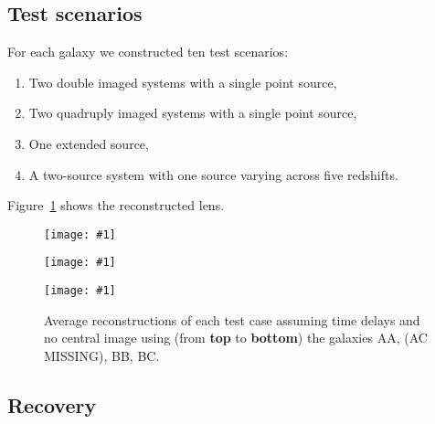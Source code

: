 \documentclass[onecolumn,galley]{mn2e}
\newcommand{\tabref}[1] {Table~\ref{#1}}
\newcommand{\figref}[1] {Figure~\ref{#1}}
\newcommand\plotone[1]{%
 \centering
 \leavevmode
 \texttt{[image: \#1]}%
}%
\begin{document}
\subsection{Test scenarios} %

For each galaxy we constructed ten test scenarios:
\begin{enumerate}
\item Two double imaged systems with a single point source,
\item Two quadruply imaged systems with a single point source,
\item One extended source, 
\item A two-source system with one source varying across five redshifts. 
\end{enumerate}

\figref{Test reconstructions} shows the reconstructed lens.

\begin{figure}
\plotone{AAarrival_surfaces}
\plotone{BBarrival_surfaces}
\plotone{BCarrival_surfaces}
\caption{Average reconstructions of each test case assuming time delays and no central image
using (from \textbf{top} to \textbf{bottom}) the galaxies AA, (AC MISSING), BB, BC.}
\label{Test reconstructions}
\end{figure}

\subsection{Recovery} %
\end{document}
